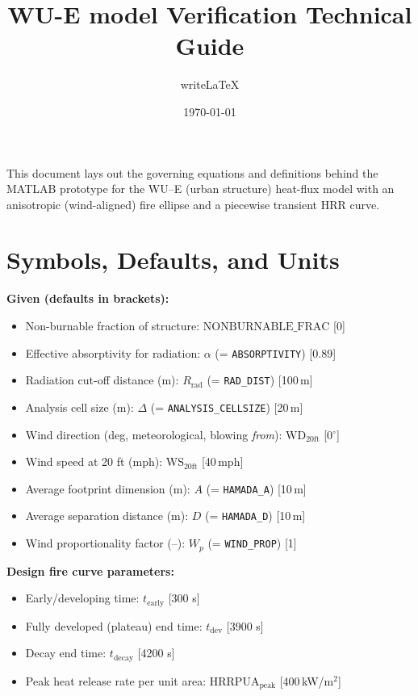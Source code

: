 \documentclass[a4paper,12pt]{article}
\title{WU-E model Verification Technical Guide}
\author{writeLaTeX}
\date{\today}
\begin{document}
\maketitle

This document lays out the governing equations and definitions behind the MATLAB prototype for the WU--E (urban structure) heat-flux model with an anisotropic (wind-aligned) fire ellipse and a piecewise transient HRR curve.

\section{Symbols, Defaults, and Units}

\noindent\textbf{Given (defaults in brackets):}
\begin{itemize}[leftmargin=1.5em]
  \item Non-burnable fraction of structure: $\mathrm{NONBURNABLE\_FRAC}$ [0]
  \item Effective absorptivity for radiation: $\alpha$ (= \texttt{ABSORPTIVITY}) [0.89]
  \item Radiation cut-off distance (m): $R_{\mathrm{rad}}$ (= \texttt{RAD\_DIST}) [100\,m]
  \item Analysis cell size (m): $\Delta$ (= \texttt{ANALYSIS\_CELLSIZE}) [20\,m]
  \item Wind direction (deg, meteorological, blowing \emph{from}): $\mathrm{WD_{20ft}}$ [0$^\circ$]
  \item Wind speed at 20 ft (mph): $\mathrm{WS_{20ft}}$ [40\,mph]
  \item Average footprint dimension (m): $A$ (= \texttt{HAMADA\_A}) [10\,m]
  \item Average separation distance (m): $D$ (= \texttt{HAMADA\_D}) [10\,m]
  \item Wind proportionality factor (--): $W_p$ (= \texttt{WIND\_PROP}) [1]
\end{itemize}

\noindent\textbf{Design fire curve parameters:}
\begin{itemize}[leftmargin=1.5em]
  \item Early/developing time: $t_{\mathrm{early}}$ [300 s]
  \item Fully developed (plateau) end time: $t_{\mathrm{dev}}$ [3900 s]
  \item Decay end time: $t_{\mathrm{decay}}$ [4200 s]
  \item Peak heat release rate per unit area: $\mathrm{HRRPUA_{peak}}$ [400\,kW/m$^2$]
\end{itemize}
\end{document}

